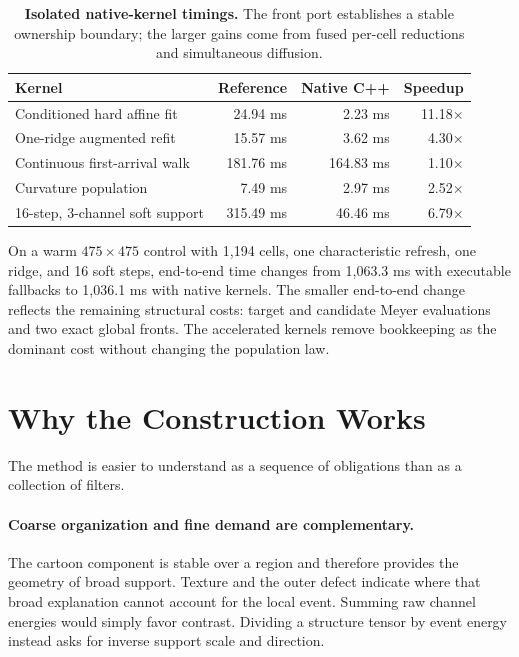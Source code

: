 \documentclass[11pt,letterpaper]{article}
\begin{document}
\begin{table}[t]
\centering
\caption{\textbf{Isolated native-kernel timings.} The front port establishes a stable
ownership boundary; the larger gains come from fused per-cell reductions and
simultaneous diffusion.}
\label{tab:native}
\begin{tabular}{lrrr}
\toprule
Kernel & Reference & Native C++ & Speedup\\
\midrule
Conditioned hard affine fit & 24.94 ms & 2.23 ms & 11.18\(\times\)\\
One-ridge augmented refit & 15.57 ms & 3.62 ms & 4.30\(\times\)\\
Continuous first-arrival walk & 181.76 ms & 164.83 ms & 1.10\(\times\)\\
Curvature population & 7.49 ms & 2.97 ms & 2.52\(\times\)\\
16-step, 3-channel soft support & 315.49 ms & 46.46 ms & 6.79\(\times\)\\
\bottomrule
\end{tabular}
\end{table}

On a warm \(475\times475\) control with 1,194 cells, one characteristic refresh, one
ridge, and 16 soft steps, end-to-end time changes from 1,063.3 ms with executable
fallbacks to 1,036.1 ms with native kernels. The smaller end-to-end change reflects the
remaining structural costs: target and candidate Meyer evaluations and two exact
global fronts. The accelerated kernels remove bookkeeping as the dominant cost without
changing the population law.

\section{Why the Construction Works}
\label{sec:why}

The method is easier to understand as a sequence of obligations than as a collection of
filters.

\paragraph{Coarse organization and fine demand are complementary.}
The cartoon component is stable over a region and therefore provides the geometry of
broad support. Texture and the outer defect indicate where that broad explanation
cannot account for the local event. Summing raw channel energies would simply favor
contrast. Dividing a structure tensor by event energy instead asks for inverse support
scale and direction.
\end{document}
